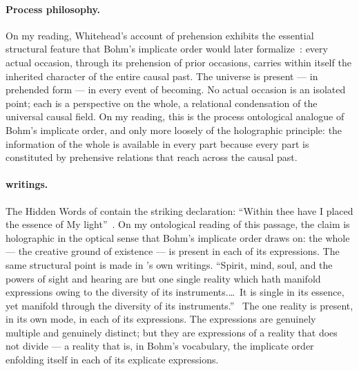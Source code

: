 \paragraph{Process philosophy.}
On my reading, Whitehead's account of prehension exhibits the essential
structural feature that Bohm's implicate order would later
formalize~\citep{Whitehead1929}: every actual occasion, through its
prehension of prior occasions, carries within itself the inherited
character of the entire causal past.
The universe is present --- in prehended form --- in every event of becoming.
No actual occasion is an isolated point; each is a perspective on the whole,
a relational condensation of the universal causal field.
On my reading, this is the process ontological analogue of Bohm's implicate
order, and only more loosely of the holographic principle: the information of
the whole is available in every part because every part is constituted by
prehensive relations that reach across the causal past.

\paragraph{\bahai writings.}
The Hidden Words of \Bahaullah contain the striking declaration:
``Within thee have I placed the essence of My light''~\citep[Arabic no.~12]{HiddenWords}.
On my ontological reading of this passage, the claim is holographic
in the optical sense that Bohm's implicate order draws on: the whole --- the
creative ground of existence --- is present in each of its expressions.
The same structural point is made in \Bahaullah's own writings.
``Spirit, mind, soul, and the powers of sight and hearing are but one
single reality which hath manifold expressions owing to the diversity
of its instruments.\ldots\ It is single in its essence, yet manifold
through the diversity of its instruments.''~\citep[para.~35]{SummonsLordHosts}
The one reality is present, in its own mode, in each of its expressions.
The expressions are genuinely multiple and genuinely distinct; but they
are expressions of a reality that does not divide --- a reality that is,
in Bohm's vocabulary, the implicate order enfolding itself in each
of its explicate expressions.

